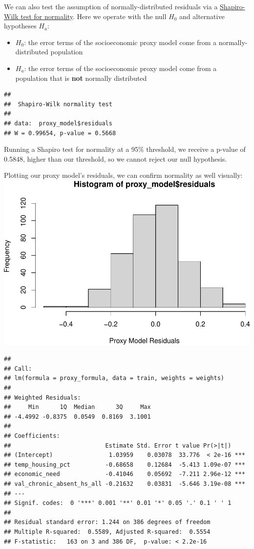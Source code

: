 \documentclass[
  man,floatsintext]{apa6}
\providecommand{\tightlist}{%
  \setlength{\itemsep}{0pt}\setlength{\parskip}{0pt}}
\begin{document}
We can also test the assumption of normally-distributed residuals via a \href{https://en.wikipedia.org/wiki/Shapiro–Wilk_test}{Shapiro-Wilk test for normality}. Here we operate with the null \(H_0\) and alternative hypotheses \(H_a\):

\begin{itemize}
\tightlist
\item
  \(H_0\): the error terms of the socioeconomic proxy model come from a normally-distributed population
\item
  \(H_a\): the error terms of the socioeconomic proxy model come from a population that is \textbf{not} normally distributed
\end{itemize}

\begin{verbatim}
## 
##  Shapiro-Wilk normality test
## 
## data:  proxy_model$residuals
## W = 0.99654, p-value = 0.5668
\end{verbatim}

Running a Shapiro test for normality at a 95\% threshold, we receive a p-value of 0.5848, higher than our threshold, so we cannot reject our null hypothesis.

Plotting our proxy model's residuals, we can confirm normality as well visually:
\includegraphics{final-project_files/figure-latex/proxy-residual-plot-1.pdf}

\begin{verbatim}
## 
## Call:
## lm(formula = proxy_formula, data = train, weights = weights)
## 
## Weighted Residuals:
##     Min      1Q  Median      3Q     Max 
## -4.4992 -0.8375  0.0549  0.8169  3.1001 
## 
## Coefficients:
##                           Estimate Std. Error t value Pr(>|t|)    
## (Intercept)                1.03959    0.03078  33.776  < 2e-16 ***
## temp_housing_pct          -0.68658    0.12684  -5.413 1.09e-07 ***
## economic_need             -0.41046    0.05692  -7.211 2.96e-12 ***
## val_chronic_absent_hs_all -0.21632    0.03831  -5.646 3.19e-08 ***
## ---
## Signif. codes:  0 '***' 0.001 '**' 0.01 '*' 0.05 '.' 0.1 ' ' 1
## 
## Residual standard error: 1.244 on 386 degrees of freedom
## Multiple R-squared:  0.5589, Adjusted R-squared:  0.5554 
## F-statistic:   163 on 3 and 386 DF,  p-value: < 2.2e-16
\end{verbatim}
\end{document}
